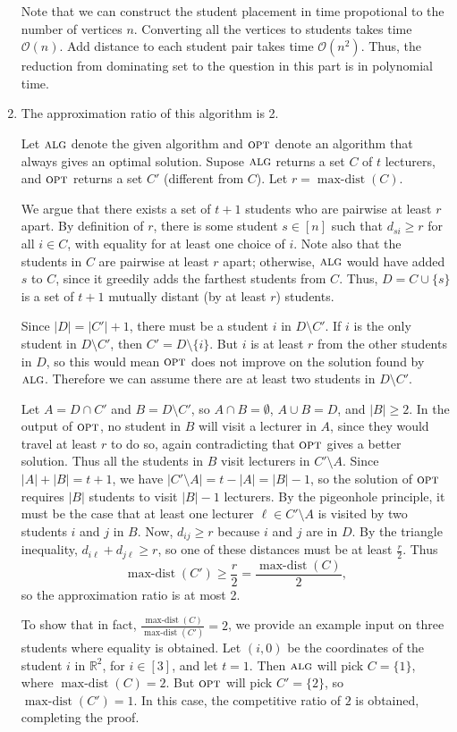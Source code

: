 \documentclass[11pt]{article}
\newcommand{\R}{\mathbb{R}}
\renewcommand{\O}{\mathcal{O}}
\newcommand{\alg}{\textsc{alg}}
\newcommand{\opt}{\textsc{opt}}
\begin{document}
\begin{enumerate}[(1)]
\noindent Note that we can construct the student placement in time propotional to the number of vertices $n$.
	Converting all the vertices to students takes time $\O(n)$.
	Add distance to each student pair takes time $\O(n^2)$.
	Thus, the reduction from dominating set to the question in this part is in polynomial time.\\
  \item The approximation ratio of this algorithm is 2.
  
  Let $\alg$ denote the given algorithm and $\opt$ denote an algorithm that always gives an optimal solution.
  Supose $\alg$ returns a set $C$ of $t$ lecturers, and $\opt$ returns a set $C'$ (different from $C$).
  Let $r = \operatorname{max-dist}(C)$.

  We argue that there exists a set of $t+1$ students who are pairwise at least $r$ apart.
  By definition of $r$, there is some student $s \in [n]$ such that $d_{si} \geq r$ for all $i \in C$, with equality for at least one choice of $i$.
  Note also that the students in $C$ are pairwise at least $r$ apart; otherwise, $\alg$ would have added $s$ to $C$, since it greedily adds the farthest students from $C$.
  Thus, $D = C \cup \{s\}$ is a set of $t+1$ mutually distant (by at least $r$) students.

  Since $|D| = |C'| + 1$, there must be a student $i$ in $D \setminus C'$.
  If $i$ is the only student in $D \setminus C'$, then $C' = D \setminus \{i\}$.
  But $i$ is at least $r$ from the other students in $D$, so this would mean $\opt$ does not improve on the solution found by $\alg$.
  Therefore we can assume there are at least two students in $D \setminus C'$.

  Let $A = D \cap C'$ and $B = D \setminus C'$, so $A \cap B = \emptyset$, $A \cup B = D$, and $|B| \geq 2$.
  In the output of $\opt$, no student in $B$ will visit a lecturer in $A$, since they would travel at least $r$ to do so, again contradicting that $\opt$ gives a better solution.
  Thus all the students in $B$ visit lecturers in $C' \setminus A$.
  Since $|A| + |B| = t + 1$, we have $|C' \setminus A| = t - |A| = |B| - 1$, so the solution of $\opt$ requires $|B|$ students to visit $|B| - 1$ lecturers.
  By the pigeonhole principle, it must be the case that at least one lecturer $\ell \in C' \setminus A$ is visited by two students $i$ and $j$ in $B$.
  Now, $d_{ij} \geq r$ because $i$ and $j$ are in $D$.
  By the triangle inequality, $d_{i \ell} + d_{j \ell} \geq r$, so one of these distances must be at least $\frac{r}{2}$.
  Thus \[\operatorname{max-dist}(C') \geq \frac{r}{2} = \frac{\operatorname{max-dist}(C)}{2},\] so the approximation ratio is at most 2.

  To show that in fact, $\frac{\operatorname{max-dist}(C)}{\operatorname{max-dist}(C')} = 2$, we provide an example input on three students where equality is obtained.
  Let $(i, 0)$ be the coordinates of the student $i$ in $\R^2$, for $i \in [3]$, and let $t = 1$.
  Then $\alg$ will pick $C = \{1\}$, where $\operatorname{max-dist}(C) = 2$.
  But $\opt$ will pick $C' = \{2\}$, so $\operatorname{max-dist}(C') = 1$.
  In this case, the competitive ratio of $2$ is obtained, completing the proof.
\end{enumerate}
\end{document}
